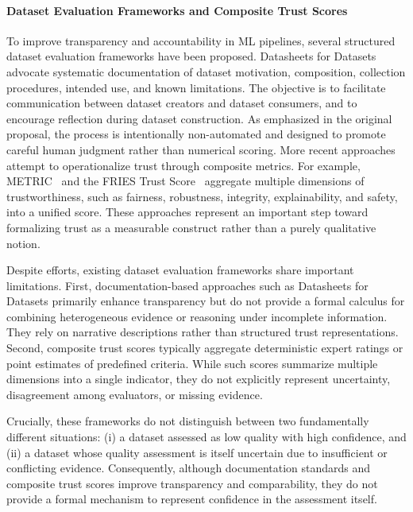 \paragraph{Dataset Evaluation Frameworks and Composite Trust Scores}

To improve transparency and accountability in \ac{ML} pipelines, several structured dataset evaluation frameworks have been proposed. Datasheets for Datasets~\cite{gebru2018datasheets} advocate systematic documentation of dataset motivation, composition, collection procedures, intended use, and known limitations. The objective is to facilitate communication between dataset creators and dataset consumers, and to encourage reflection during dataset construction. As emphasized in the original proposal, the process is intentionally non-automated and designed to promote careful human judgment rather than numerical scoring. More recent approaches attempt to operationalize trust through composite metrics. For example, METRIC~\cite{schwabe2024metric} and the FRIES Trust Score~\cite{10.1007/978-3-031-63787-2_15} aggregate multiple dimensions of trustworthiness, such as fairness, robustness, integrity, explainability, and safety, into a unified score. These approaches represent an important step toward formalizing trust as a measurable construct rather than a purely qualitative notion.

Despite efforts, existing dataset evaluation frameworks share important limitations. First, documentation-based approaches such as Datasheets for Datasets primarily enhance transparency but do not provide a formal calculus for combining heterogeneous evidence or reasoning under incomplete information. They rely on narrative descriptions rather than structured trust representations. Second, composite trust scores typically aggregate deterministic expert ratings or point estimates of predefined criteria. While such scores summarize multiple dimensions into a single indicator, they do not explicitly represent uncertainty, disagreement among evaluators, or missing evidence.

Crucially, these frameworks do not distinguish between two fundamentally different situations: (i) a dataset assessed as low quality with high confidence, and (ii) a dataset whose quality assessment is itself uncertain due to insufficient or conflicting evidence. Consequently, although documentation standards and composite trust scores improve transparency and comparability, they do not provide a formal mechanism to represent confidence in the assessment itself.



